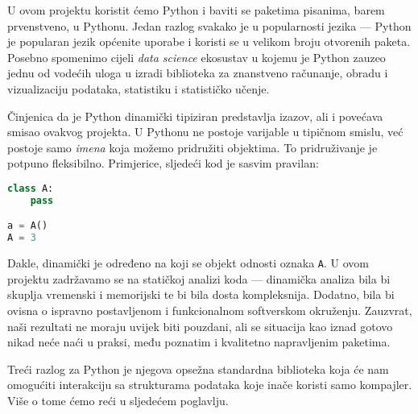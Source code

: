 U ovom projektu koristit ćemo Python i baviti se paketima pisanima, barem prvenstveno, u Pythonu. Jedan razlog svakako je u popularnosti jezika ---
Python je popularan jezik općenite uporabe i koristi se u
velikom broju otvorenih paketa. Posebno spomenimo cijeli \emph{data science} ekosustav u kojemu je Python zauzeo jednu od vodećih uloga u izradi biblioteka za znanstveno računanje, obradu i vizualizaciju podataka, statistiku i statističko učenje.


Činjenica da je Python dinamički tipiziran predstavlja izazov, ali i povećava smisao ovakvog projekta. U Pythonu ne postoje varijable u tipičnom smislu, već postoje samo \emph{imena} koja možemo pridružiti objektima. To pridruživanje je potpuno fleksibilno. Primjerice, sljedeći kod je sasvim pravilan:
\begin{lstlisting}[language=Python]
class A:
	pass

a = A()
A = 3
\end{lstlisting}

Dakle, dinamički je određeno na koji se objekt odnosti oznaka \texttt{A}.
U ovom projektu zadržavamo se na statičkoj analizi koda --- dinamička analiza bila bi skuplja vremenski i memorijski te bi bila dosta kompleksnija. Dodatno, bila bi ovisna o ispravno postavljenom i funkcionalnom softverskom okruženju. Zauzvrat, naši rezultati ne moraju uvijek biti pouzdani, ali
se situacija kao iznad gotovo nikad neće naći u praksi, među
poznatim i kvalitetno napravljenim paketima.

Treći razlog za Python je njegova opsežna standardna biblioteka koja će nam omogućiti interakciju sa strukturama podataka koje inače koristi samo kompajler. Više o tome ćemo reći u sljedećem poglavlju.


